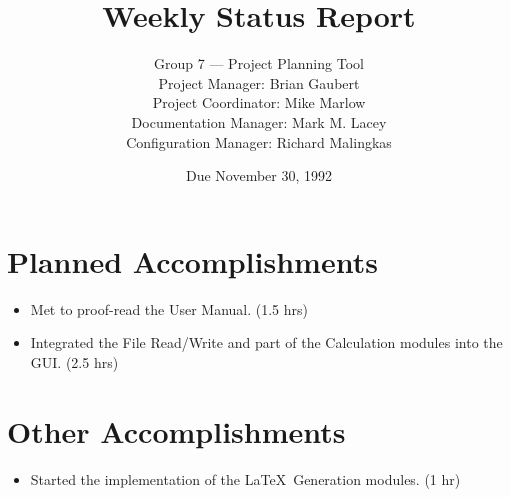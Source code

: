 


\title{Weekly Status Report}

\author{Group 7 --- Project Planning Tool\\
Project Manager: Brian Gaubert\\
Project Coordinator: Mike Marlow\\
Documentation Manager: Mark M. Lacey\\
Configuration Manager: Richard Malingkas}

\date{Due November 30, 1992}

\maketitle

%
%
%
\section{Planned Accomplishments}
\begin{itemize}
	\item Met to proof-read the User Manual. (1.5 hrs)
	\item Integrated the File Read/Write and part of the Calculation modules
into the GUI. (2.5 hrs)

\end{itemize}

%
%
%
\section{Other Accomplishments}
\begin{itemize}
	\item Started the implementation of the \LaTeX\ Generation modules. (1 hr)
\end{itemize}

%
%
%
